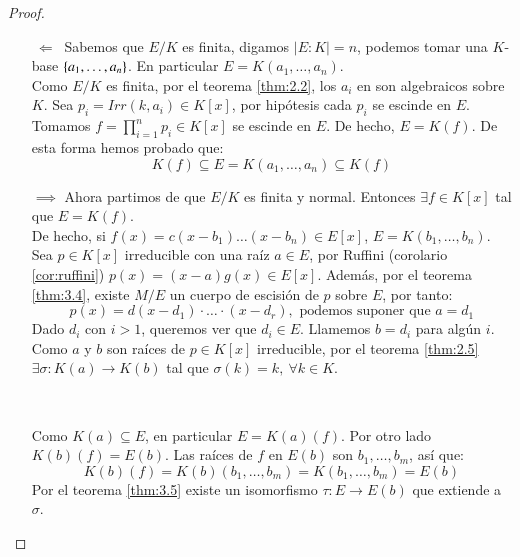 \begin{proof}$ $
    \begin{itemize}
        \item[$\ \Longleftarrow\ $] Sabemos que $E/K$ es finita, digamos $|E:K| = n$, podemos tomar una $K$-base $\left\{a_1, \ldots, a_n\right\}$. En particular $E=K(a_1, \ldots, a_n)$.\\
        Como $E/K$ es finita, por el teorema \ref{thm:2.2}, los $a_i$ en son algebraicos sobre $K$. Sea $p_i = Irr(k, a_i) \in K[x]$, por hipótesis cada $p_i$ se escinde en $E$.\\

        Tomamos $f = \prod_{i=1}^{n} p_i \in K[x]$ se escinde en $E$. De hecho, $E = K(f)$. De esta forma hemos probado que:
        $$
            K(f) \subseteq E = K(a_1, \ldots, a_n) \subseteq K(f)
        $$
        \item[$\implies$] Ahora partimos de que $E/K$ es finita y normal. Entonces $\exists f \in K[x]$ tal que $E = K(f)$.\\
        De hecho, si $f(x) = c(x - b_1) \ldots (x-b_n) \in E[x]$, $E = K(b_1, \ldots, b_n)$.\\
        Sea $p\in K[x]$ irreducible con una raíz $a\in E$, por Ruffini (corolario \ref{cor:ruffini}) $p(x) = (x-a)g(x)\in E[x]$. Además, por el teorema \ref{thm:3.4}, existe $M/E$ un cuerpo de escisión de $p$ sobre $E$, por tanto:
        $$
            p(x) = d(x-d_1) \cdot \ldots \cdot (x-d_r), \text{ podemos suponer que $a = d_1$}
        $$
        Dado $d_i$ con $i > 1$, queremos ver que $d_i \in E$. Llamemos $b = d_i$ para algún $i$. Como $a$ y $b$ son raíces de $p \in K[x]$ irreducible, por el teorema \ref{thm:2.5} $\exists \sigma: K(a) \to K(b)$ tal que $\sigma(k) = k,\ \forall k \in K$.

        \begin{center}
            \\
        \end{center}

        Como $K(a) \subseteq E$, en particular $E = K(a)(f)$. Por otro lado $K(b)(f) = E(b)$. Las raíces de $f$ en $E(b)$ son $b_1, \ldots, b_m$, así que:
        $$
            K(b)(f) = K(b)(b_1, \ldots, b_m) = K(b_1, \ldots, b_m) = E(b)
        $$
        Por el teorema \ref{thm:3.5} existe un isomorfismo $\tau: E \to E(b)$ que extiende a $\sigma$.


\end{itemize}
\end{proof}
